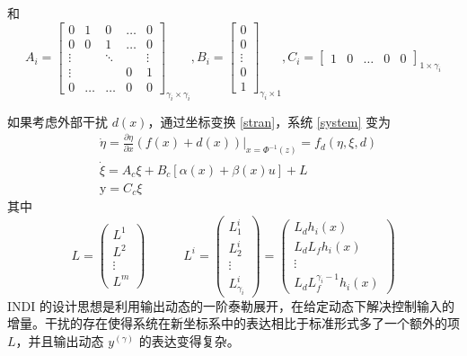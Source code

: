 \begin{ubox}
\begin{equation}
  \end{equation}
  和
  \begin{equation}
	A_i=\left[\begin{array}{ccccc}0&1&0&\dots&0\\0&0&1&\dots&0\\\vdots&&\ddots&&\vdots\\\vdots&&&0&1\\0&\dots&\dots&0&0\end{array}\right]_{\gamma_i \times \gamma_i}, B_i=\left[\begin{array}{c}0\\0\\\vdots\\0\\1\end{array}\right]_{\gamma_i \times 1}, C_i=\left[\begin{array}{ccccc}1&0&\dots&0&0\end{array}\right]_{1 \times \gamma_i}
  \end{equation}
   
  如果考虑外部干扰 $d(x)$，通过坐标变换 \eqref{stran}，系统 \eqref{system} 变为 
  \begin{equation}
	\begin{aligned}
	  &\dot{\eta}=\frac{\partial\eta}{\partial x}(f(x)+d(x))\Big|_{x=\Phi^{-1}(z)}= f_{d}(\eta,\xi,d)\\
	  &\dot{\xi}= A_{c}\xi+B_{c}[\alpha(x)+\beta(x)u] + L\\
	  &\text{y}= C_{c}\xi\end{aligned}
	  \label{with_external}
  \end{equation}
  其中
  \begin{equation}
	L=\begin{pmatrix}L^1\\L^2\\\vdots\\L^m\end{pmatrix} \quad \quad \quad L^i=\begin{pmatrix}L_1^i\\L_2^i\\\vdots\\L_{\gamma_i}^i\end{pmatrix}=\begin{pmatrix}L_{d}h_{i}(x)\\L_{d}L_{f}h_{i}(x)\\\vdots\\L_{d}L_{f}^{\gamma_i -1}h_{i}(x)\end{pmatrix} 
  \end{equation}
  INDI 的设计思想是利用输出动态的一阶泰勒展开，在给定动态下解决控制输入的增量。干扰的存在使得系统在新坐标系中的表达相比于标准形式多了一个额外的项 $L$，并且输出动态 $y^{(\gamma)}$ 的表达变得复杂。
  

\end{ubox}

